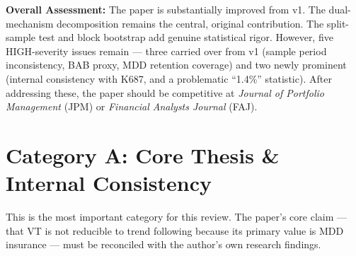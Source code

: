 \documentclass[12pt,a4paper]{article}
\begin{document}
\noindent\textbf{Overall Assessment:} The paper is substantially improved from v1. The dual-mechanism decomposition remains the central, original contribution. The split-sample test and block bootstrap add genuine statistical rigor. However, five HIGH-severity issues remain --- three carried over from v1 (sample period inconsistency, BAB proxy, MDD retention coverage) and two newly prominent (internal consistency with K687, and a problematic ``1.4\%'' statistic). After addressing these, the paper should be competitive at \textit{Journal of Portfolio Management} (JPM) or \textit{Financial Analysts Journal} (FAJ).


\section{Category A: Core Thesis \& Internal Consistency}

This is the most important category for this review. The paper's core claim --- that VT is not reducible to trend following because its primary value is MDD insurance --- must be reconciled with the author's own research findings.
\end{document}
